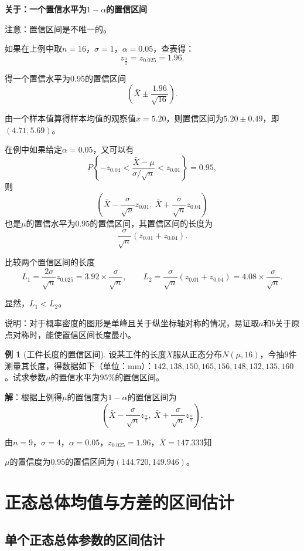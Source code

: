\documentclass[11pt,a4paper]{report}
\theoremstyle{definition}
\newtheorem{example}{例}[chapter]
\begin{document}
\textbf{关于：一个置信水平为$1-\alpha$的置信区间}

注意：置信区间是不唯一的。

如果在上例中取$n=16$，$\sigma=1$，$\alpha=0.05$，查表得：
\[
z_{\frac{\alpha}{2}}=z_{0.025}=1.96.
\]

得一个置信水平为$0.95$的置信区间
\[
\left(\bar{X}\pm\frac{1.96}{\sqrt{16}}\right).
\]

由一个样本值算得样本均值的观察值$\bar{x}=5.20$，则置信区间为$5.20\pm0.49$，即$(4.71,5.69)$。

在例中如果给定$\alpha=0.05$，又可以有
\[
P\left\{-z_{0.04}<\frac{\bar{X}-\mu}{\sigma/\sqrt{n}}<z_{0.01}\right\}=0.95,
\]
则
\[
\left(\bar{X}-\frac{\sigma}{\sqrt{n}}z_{0.01},\ \bar{X}+\frac{\sigma}{\sqrt{n}}z_{0.04}\right)
\]
也是$\mu$的置信水平为$0.95$的置信区间，其置信区间的长度为
\[
\frac{\sigma}{\sqrt{n}}(z_{0.01}+z_{0.04}).
\]

比较两个置信区间的长度
\[
L_{1}=\frac{2\sigma}{\sqrt{n}}z_{0.025}=3.92\times\frac{\sigma}{\sqrt{n}},\qquad
L_{2}=\frac{\sigma}{\sqrt{n}}(z_{0.01}+z_{0.04})=4.08\times\frac{\sigma}{\sqrt{n}}.
\]

显然，$L_{1}<L_{2}$。

说明：对于概率密度的图形是单峰且关于纵坐标轴对称的情况，易证取$a$和$b$关于原点对称时，能使置信区间长度最小。

\begin{example}[工件长度的置信区间]
设某工件的长度$X$服从正态分布$N(\mu,16)$，今抽$9$件测量其长度，得数据如下（单位：mm）：$142,138,150,165,156,148,132,135,160$。试求参数$\mu$的置信水平为$95\%$的置信区间。

\textbf{解}：根据上例得$\mu$的置信度为$1-\alpha$的置信区间为
\[
\left(\bar{X}-\frac{\sigma}{\sqrt{n}}z_{\frac{\alpha}{2}},\ \bar{X}+\frac{\sigma}{\sqrt{n}}z_{\frac{\alpha}{2}}\right).
\]

由$n=9$，$\sigma=4$，$\alpha=0.05$，$z_{0.025}=1.96$，$\bar{X}=147.333$知

$\mu$的置信度为$0.95$的置信区间为$(144.720,149.946)$。
\end{example}

\section{正态总体均值与方差的区间估计}

\subsection{单个正态总体参数的区间估计}
\end{document}
